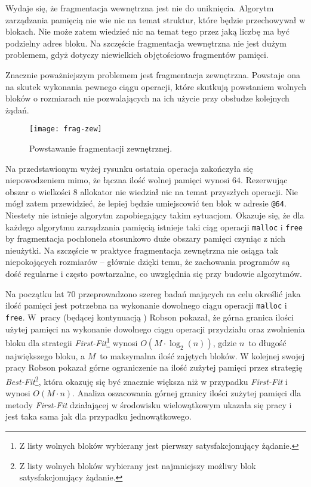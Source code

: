 \documentclass[12pt,a4paper,titlepage,twoside]{mwart}
\begin{document}
Wydaje się, że fragmentacja wewnętrzna jest nie do uniknięcia. Algorytm
zarządzania pamięcią nie wie nic na temat struktur, które będzie przechowywał w
blokach. Nie może zatem wiedzieć nic na temat tego przez jaką liczbę ma być
podzielny adres bloku. Na szczęście fragmentacja wewnętrzna nie jest dużym
problemem, gdyż dotyczy niewielkich objętościowo fragmentów pamięci.

Znacznie poważniejszym problemem jest fragmentacja zewnętrzna. Powstaje ona na
skutek wykonania pewnego ciągu operacji, które skutkują powstaniem wolnych
bloków o rozmiarach nie pozwalających na ich użycie przy obsłudze kolejnych
żądań.

\begin{figure}[h]
\centering
\texttt{[image: frag-zew]}
\caption{Powstawanie fragmentacji zewnętrznej.}
\end{figure}

Na przedstawionym wyżej rysunku ostatnia operacja zakończyła się niepowodzeniem
mimo, że łączna ilość wolnej pamięci wynosi $64$. Rezerwując obszar o wielkości
$8$ allokator nie wiedział nic na temat przyszłych operacji. Nie mógł zatem
przewidzieć, że lepiej będzie umiejscowić ten blok w adresie \verb+@64+.
Niestety nie istnieje algorytm zapobiegający takim sytuacjom. Okazuje się, że
dla każdego algorytmu zarządzania pamięcią istnieje taki ciąg operacji
\texttt{malloc} i \texttt{free} by fragmentacja pochłoneła stosunkowo duże
obszary pamięci czyniąc z nich nieużytki. Na szczęście w praktyce fragmentacja
zewnętrzna nie osiąga tak niepokojących rozmiarów -- głównie dzięki temu, że
zachowania programów są dość regularne i często powtarzalne, co uwzględnia się
przy budowie algorytmów.

Na początku lat 70 przeprowadzono szereg badań mających na celu określić jaka
ilość pamięci jest potrzebna na wykonanie dowolnego ciągu operacji
\texttt{malloc} i \texttt{free}. W~pracy \cite{robson74bounds} (będącej
kontynuacją \cite{robson71estimate}) Robson pokazał, że górna granica ilości
użytej pamięci na wykonanie dowolnego ciągu operacji przydziału oraz zwolnienia
bloku dla strategii \textit{First-Fit}\footnote{Z listy wolnych bloków
wybierany jest pierwszy satysfakcjonujący żądanie.} wynosi $O(M \cdot
\log_{2}(n))$, gdzie $n$~to długość największego bloku, a $M$~to maksymalna
ilość zajętych bloków. W kolejnej swojej pracy \cite{robson77worst} Robson
pokazał górne ograniczenie na ilość zużytej pamięci przez strategię
\textit{Best-Fit}\footnote{Z listy wolnych bloków wybierany jest najmniejszy
możliwy blok satysfakcjonujący żądanie.}, która okazuję się być znacznie
większa niż w przypadku \textit{First-Fit} i wynosi $O(M \cdot n)$. Analiza
oszacowania górnej granicy ilości zużytej pamięci dla metody \textit{First-Fit}
działającej w środowisku wielowątkowym ukazała się pracy \cite{luby94tight} i
jest taka sama jak dla przypadku jednowątkowego.
\end{document}

